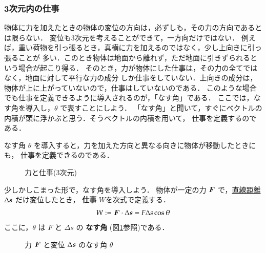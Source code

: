         \subsubsection{3次元内の仕事}
                物体に力を加えたときの物体の変位の方向は，必ずしも，その力の方向であるとは限らない．
                変位も3次元を考えることができて，一方向だけではない．
                例えば，重い荷物を引っ張るとき，真横に力を加えるのではなく，少し上向きに引っ張ることが
                多い．このとき物体は地面から離れず，ただ地面に引きずられるという場合が起こり得る．
                そのとき，力が物体にした仕事は，その力の全てではなく，地面に対して平行な力の成分
                しか仕事をしていない．上向きの成分は，物体が上に上がっていないので，仕事はしていないのである．
                このような場合でも仕事を定義できるように導入されるのが，「なす角」である．
                ここでは，なす角を導入し，$\theta$ で表すことにしよう．
                「なす角」と聞いて，すぐにベクトルの内積が頭に浮かぶと思う．そうベクトルの内積を用いて，
                仕事を定義するのである．

                なす角 $\theta$ を導入すると，力を加えた方向と異なる向きに物体が移動したときにも，
                仕事を定義できるのである．
                    \begin{figure}[hbt]
                        \begin{center}
                            \caption{力と仕事(3次元)}
                        \end{center}
                    \end{figure}

                少しかしこまった形で，なす角を導入しよう．
                物体が一定の力 $\boldsymbol{F}$ で，\underline{直線距離} $\Delta \textit{\textbf{s}}$ だけ変位したとき，
                \textbf{仕事} $W$を次式で定義する．
                    \begin{align}
                        W:=\boldsymbol{F}\cdot\Delta \textit{\textbf{s}}=F\Delta s \cos \theta
                    \end{align}
                ここに，$\theta$ は $F$ と $\Delta s$ の \textbf{なす角} (図\ref{fig:nasu}参照)である．
                    \begin{figure}[hbt]
                        \begin{center}
                            \caption{力 $\boldsymbol{F}$ と変位 $\Delta\textit{\textbf{s}}$ のなす角 $\theta$ }
                            \label{fig:nasu}
                        \end{center}
                    \end{figure}


